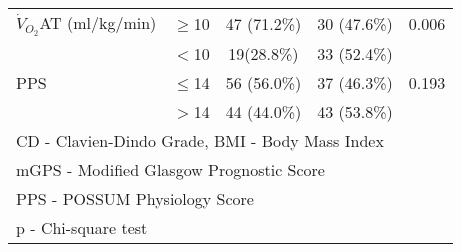 \begin{table}[p]
\begin{tabular}{|l l c c c|}
		$\dot{V}_{O_2}$AT (ml/kg/min)     & $\geq$10 & 47 (71.2\%) & 30 (47.6\%)                  & 0.006      \\
		                       & $<$10    & 19(28.8\%)  & 33 (52.4\%)                  &  \\
		PPS                    & $\leq$14 & 56 (56.0\%) & 37 (46.3\%)                  & 0.193      \\
		                       & $>$14    & 44 (44.0\%) & 43 (53.8\%)                  &  \\ \hline
		\multicolumn{5}{l}{CD - Clavien-Dindo Grade, BMI - Body Mass Index}                         \\
		\multicolumn{5}{l}{mGPS - Modified Glasgow Prognostic Score}                                \\
		\multicolumn{5}{l}{PPS - POSSUM Physiology Score}                                           \\
		\multicolumn{5}{l}{p - Chi-square test}
	\end{tabular}
\end{table}


		
		
		
